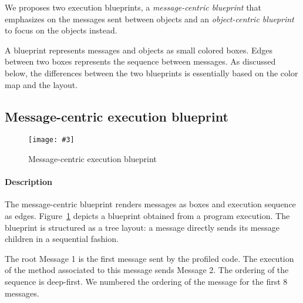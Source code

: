 \documentclass[10pt, conference, compsocconf]{IEEEtran}
\newcommand{\fig}[4]{
	\begin{figure}[#1]
		\centering
		\texttt{[image: \#3]}
		\caption{\label{fig:#3}#4}
	\end{figure}}
\newcommand{\figref}[1]{Figure~\ref{fig:#1}}
\newcommand{\secref}[1]{Section~\ref{sec:#1}}
\begin{document}
We proposes two execution blueprints, a \emph{message-centric blueprint} that emphasizes on the messages sent between objects and an \emph{object-centric blueprint} to focus on the objects instead.

A blueprint represents messages and objects as small colored boxes. Edges between two boxes represents the sequence between messages. As discussed below, the differences between the two blueprints is essentially based on the color map and the layout.


%
%
%


\subsection{Message-centric execution blueprint}

\fig{}{0.48}{MessageCentricBlueprint}{Message-centric execution blueprint}

\paragraph{Description}

The message-centric blueprint renders messages as boxes and execution sequence as edges. \figref{MessageCentricBlueprint} depicts a blueprint obtained from a program execution. The blueprint is structured as a tree layout: a message directly sends its message children in a sequential fashion. 

The root Message 1 is the first message sent by the profiled code. The execution of the method associated to this message sends Message 2. The ordering of the sequence is deep-first. We numbered the ordering of the message for the first 8 messages. 
\end{document}
